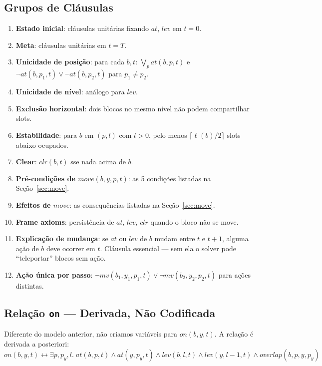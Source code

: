 \documentclass[12pt,a4paper]{article}
\begin{document}
\subsection{Grupos de Cláusulas}

\begin{enumerate}[leftmargin=1.2cm]
    \item \textbf{Estado inicial}: cláusulas unitárias fixando $at$, $lev$ em $t=0$.
    \item \textbf{Meta}: cláusulas unitárias em $t=T$.
    \item \textbf{Unicidade de posição}: para cada $b,t$: $\bigvee_p at(b,p,t)$ e $\neg at(b,p_1,t) \vee \neg at(b,p_2,t)$ para $p_1 \neq p_2$.
    \item \textbf{Unicidade de nível}: análogo para $lev$.
    \item \textbf{Exclusão horizontal}: dois blocos no mesmo nível não podem compartilhar slots.
    \item \textbf{Estabilidade}: para $b$ em $(p,l)$ com $l>0$, pelo menos $\lceil \ell(b)/2 \rceil$ slots abaixo ocupados.
    \item \textbf{Clear}: $clr(b,t)$ sse nada acima de $b$.
    \item \textbf{Pré-condições de $move(b,y,p,t)$}: as 5 condições listadas na Seção~\ref{sec:move}.
    \item \textbf{Efeitos de $move$}: as consequências listadas na Seção~\ref{sec:move}.
    \item \textbf{Frame axioms}: persistência de $at$, $lev$, $clr$ quando o bloco não se move.
    \item \textbf{Explicação de mudança}: se $at$ ou $lev$ de $b$ mudam entre $t$ e $t+1$, alguma ação de $b$ deve ocorrer em $t$. Cláusula essencial — sem ela o solver pode ``teleportar'' blocos sem ação.
    \item \textbf{Ação única por passo}: $\neg mv(b_1,y_1,p_1,t) \vee \neg mv(b_2,y_2,p_2,t)$ para ações distintas.
\end{enumerate}

\subsection{Relação \texttt{on} — Derivada, Não Codificada}

Diferente do modelo anterior, não criamos variáveis para $on(b,y,t)$. A relação é derivada a posteriori:
\[
on(b,y,t) \leftrightarrow \exists p, p_y, l.\; at(b,p,t) \wedge at(y,p_y,t) \wedge lev(b,l,t) \wedge lev(y,l-1,t) \wedge overlap(b,p,y,p_y)
\]
\end{document}

